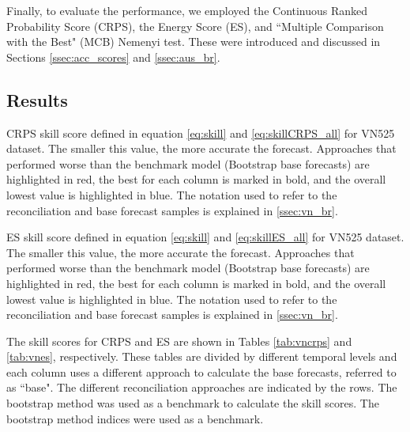 \documentclass[a4paper,11pt]{article}
\theoremstyle{definition}
\begin{document}
Finally, to evaluate the performance, we employed the Continuous Ranked Probability Score (CRPS), the Energy Score (ES), and “Multiple Comparison with the Best" (MCB) Nemenyi test. These were introduced and discussed in Sections \ref{ssec:acc_scores} and \ref{ssec:aus_br}. %

\subsection{Results}

\begin{table}[p]
	\centering
	\begingroup
	\fontsize{9}{10}\selectfont
	
	\endgroup
	\caption{CRPS skill score defined in equation \eqref{eq:skill} and \eqref{eq:skillCRPS_all} for VN525 dataset. The smaller this value, the more accurate the forecast. Approaches that performed worse than the benchmark model (Bootstrap base forecasts) are highlighted in red, the best for each column is marked in bold, and the overall lowest value is highlighted in blue. The notation used to refer to the reconciliation and base forecast samples is explained in \autoref{ssec:vn_br}.}
	\label{tab:vncrps}
\end{table}

\begin{table}[p]
	\centering
	\begingroup
	\fontsize{9}{10}\selectfont
	
	\endgroup
	\caption{ES skill score defined in equation \eqref{eq:skill} and \eqref{eq:skillES_all} for VN525 dataset. The smaller this value, the more accurate the forecast. Approaches that performed worse than the benchmark model (Bootstrap base forecasts) are highlighted in red, the best for each column is marked in bold, and the overall lowest value is highlighted in blue. The notation used to refer to the reconciliation and base forecast samples is explained in \autoref{ssec:vn_br}.}
	\label{tab:vnes}
\end{table}

The skill scores for CRPS and ES are shown in Tables \ref{tab:vncrps} and \ref{tab:vnes}, respectively. These tables are divided by different temporal levels and each column uses a different approach to calculate the base forecasts, referred to as “base". The different reconciliation approaches are indicated by the rows. The bootstrap method was used as a benchmark to calculate the skill scores. The bootstrap method indices were used as a benchmark.
\end{document}

